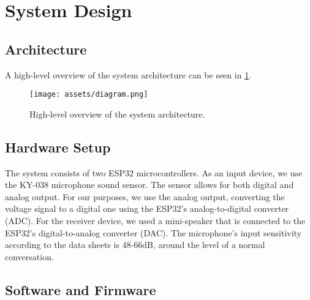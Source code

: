 \documentclass[conference]{IEEEtran}
\begin{document}

\section{System Design}
\label{sec:system_design}

\subsection{Architecture}

A high-level overview of the system architecture can be seen in \cref{fig:architecture}.

\begin{figure}[h]
    \hspace*{-0.4cm}
    \texttt{[image: assets/diagram.png]}
    \vspace{-1.5cm}
    \caption{High-level overview of the system architecture.}
    \label{fig:architecture}
\end{figure}

\subsection{Hardware Setup}
The system consists of two ESP32\cite{ESP32_Manual} microcontrollers.
As an input device, we use the KY-038\cite{KY-038} microphone sound sensor.
The sensor allows for both digital and analog output.
For our purposes, we use the analog output, converting the voltage signal to a digital one using the
ESP32's analog-to-digital converter (ADC).
For the receiver device, we used a mini-speaker that is connected to the ESP32's digital-to-analog converter (DAC).
The microphone's input sensitivity according to the data sheets is 48-66dB, around the level of a normal conversation.

\subsection{Software and Firmware}
\end{document}
